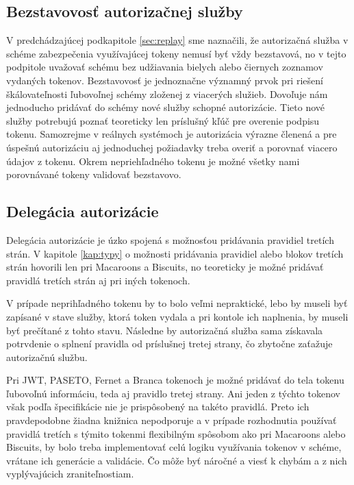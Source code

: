 \subsection{Bezstavovosť autorizačnej služby}

V predchádzajúcej podkapitole \ref{sec:replay} sme naznačili, že autorizačná služba v schéme zabezpečenia využívajúcej tokeny nemusí byť vždy bezstavová, no v tejto podpitole uvažovať schému bez udžiavania bielych alebo čiernych zoznamov vydaných tokenov. Bezstavovosť je jednoznačne významný prvok pri riešení škálovateľnosti ľubovoľnej schémy zloženej z viacerých služieb. Dovoľuje nám jednoducho pridávať do schémy nové služby schopné autorizácie. Tieto nové služby potrebujú poznať teoreticky len príslušný kľúč pre overenie podpisu tokenu. Samozrejme v reálnych systémoch je autorizácia výrazne členená a pre úspešnú autorizáciu aj jednoduchej požiadavky treba overiť a porovnať viacero údajov z tokenu. Okrem nepriehľadného tokenu je možné všetky nami porovnávané tokeny validovať bezstavovo.

\subsection{Delegácia autorizácie}

Delegácia autorizácie je úzko spojená s možnosťou pridávania pravidiel tretích strán. V kapitole \ref{kap:typy} o možnosti pridávania pravidiel alebo blokov tretích strán hovorili len pri Macaroons a Biscuits, no teoreticky je možné pridávať pravidlá tretích strán aj pri iných tokenoch. 

V prípade neprihľadného tokenu by to bolo veľmi nepraktické, lebo by museli byť zapísané v stave služby, ktorá token vydala a pri kontole ich naplnenia, by museli byť prečítané z tohto stavu. Následne by autorizačná služba sama získavala potrvdenie o splnení pravidla od príslušnej tretej strany, čo zbytočne zaťažuje autorizačnú službu.

Pri JWT, PASETO, Fernet a Branca tokenoch je možné pridávať do tela tokenu ľubovoľnú informáciu, teda aj pravidlo tretej strany. Ani jeden z týchto tokenov však podľa špecifikácie nie je prispôsobený na takéto pravidlá. Preto ich pravdepodobne žiadna knižnica nepodporuje a v prípade rozhodnutia používať pravidlá tretích s týmito tokenmi flexibilným spôsobom ako pri Macaroons alebo Biscuits, by bolo treba implementovať celú logiku využívania tokenov v schéme, vrátane ich generácie a validácie. Čo môže byť náročné a viesť k chybám a z nich vyplývajúcich zraniteľnostiam.


